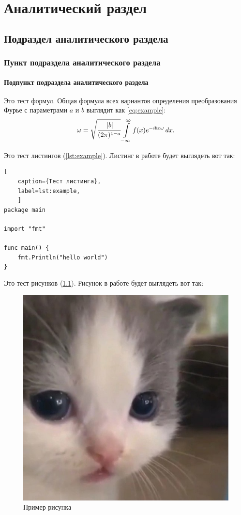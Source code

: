 \chapter{Аналитический раздел}
\section{Подраздел аналитического раздела}
\subsection{Пункт подраздела аналитического раздела}
\subsubsection{Подпункт подраздела аналитического раздела}
Это тест формул. Общая формула всех вариантов определения преобразования Фурье с параметрами $a$ и $b$ выглядит как \ref{eq:example}:
\begin{equation}\label{eq:example}
	\omega=\sqrt{\cfrac{\left|b\right|}{(2\pi )^{1-a}}}\int\limits_{-\infty}^{\infty}f(x)e^{-ibx\omega}\,dx.
\end{equation}

Это тест листингов (\ref{lst:example}). Листинг в работе будет выглядеть вот так: 
\begin{lstlisting}[
	caption={Тест листинга},
	label=lst:example,
	]
package main
	
import "fmt"

func main() {
	fmt.Println("hello world")
}
\end{lstlisting}
Это тест рисунков (\ref{fig:example}). Рисунок в работе будет выглядеть вот так: 
\begin{figure}[H]
	\centering
	\includegraphics[width=0.5\linewidth]{assets/cat.jpg}
	\caption{Пример рисунка}
	\label{fig:example}
\end{figure}


